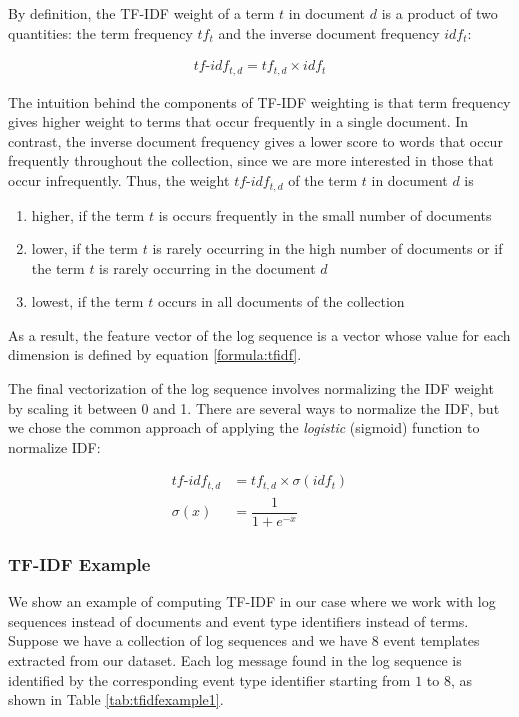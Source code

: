 By definition, the TF-IDF weight of a term $t$ in document $d$ is a product of two quantities: the term frequency $tf_t$ and the inverse document frequency $idf_t$:

\begin{gather}
    tf\text{-}idf_{t, d} = tf_{t,d} \times idf_t
    \label{formula:tfidf}
\end{gather}

The intuition behind the components of TF-IDF weighting is that term frequency gives higher weight to terms that occur frequently in a single document. In contrast, the inverse document frequency gives a lower score to words that occur frequently throughout the collection, since we are more interested in those that occur infrequently. Thus, the weight $tf\text{-}idf_{t, d}$ of the term $t$ in document $d$ is 

\begin{enumerate}
    \item higher, if the term $t$ is occurs frequently in the small number of documents
    \item lower, if the term $t$ is rarely occurring in the high number of documents or if the term $t$ is rarely occurring in the document $d$
    \item lowest, if the term $t$ occurs in all documents of the collection
\end{enumerate}

As a result, the feature vector of the log sequence is a vector whose value for each dimension is defined by equation \ref{formula:tfidf}.

The final vectorization of the log sequence involves normalizing the IDF weight by scaling it between 0 and 1. There are several ways to normalize the IDF, but we chose the common approach of applying the \textit{logistic} (sigmoid) function to normalize IDF:

\begin{align*}
    tf\text{-}idf_{t, d} &= tf_{t,d} \times \sigma(idf_t) \\
    \sigma(x) &= \dfrac{1}{1 + e^{-x}}
\end{align*}

\subsubsection*{TF-IDF Example}
We show an example of computing TF-IDF in our case where we work with log sequences instead of documents and event type identifiers instead of terms. Suppose we have a collection of log sequences and we have $8$ event templates extracted from our dataset. Each log message found in the log sequence is identified by the corresponding event type identifier starting from $1$ to $8$, as shown in Table \ref{tab:tfidfexample1}.

